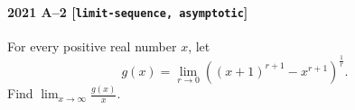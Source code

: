 \paragraph{2021 A--2 \textnormal{[\texttt{limit-sequence, asymptotic}]}}
For every positive real number $x$, let
\[
g(x) = \lim_{r \to 0} ((x+1)^{r+1} - x^{r+1})^{\frac{1}{r}}.
\]
Find $\lim_{x \to \infty} \frac{g(x)}{x}$.
